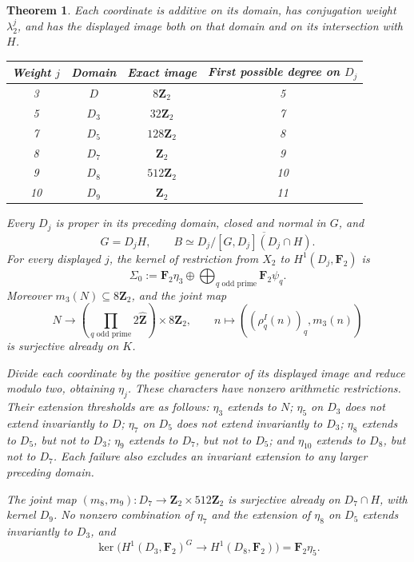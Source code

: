 \documentclass[11pt,a4paper]{article}
\newtheorem{theorem}{Theorem}[section]
\theoremstyle{definition}
\theoremstyle{remark}
\newcommand{\Zh}{\widehat{\mathbf Z}}
\newcommand{\Z}{\mathbf Z}
\newcommand{\F}{\mathbf F}
\begin{document}
\begin{theorem}\label{thm:main-finite-dyadic-examples}
Each coordinate is additive on its domain, has conjugation weight
\(\lambda_2^j\), and has the displayed image both on that domain
and on its intersection with \(H\).
\begin{center}
\begin{tabular}{@{}cccc@{}}
\toprule
Weight \(j\)&Domain&Exact image&First possible degree on \(D_j\)\\
\midrule
3&\(D\)&\(8\Z_2\)&5\\
5&\(D_3\)&\(32\Z_2\)&7\\
7&\(D_5\)&\(128\Z_2\)&8\\
8&\(D_7\)&\(\Z_2\)&9\\
9&\(D_8\)&\(512\Z_2\)&10\\
10&\(D_9\)&\(\Z_2\)&11\\
\bottomrule
\end{tabular}
\end{center}
Every \(D_j\) is proper in its preceding domain, closed and normal
in \(G\), and
\[
 G=D_jH,\qquad
 B\simeq D_j/\overline{[G,D_j](D_j\cap H)}.
\]
For every displayed \(j\), the kernel of restriction from \(X_2\)
to \(H^1(D_j,\F_2)\) is
\[
 \Sigma_0:=\F_2\eta_3\oplus
       \bigoplus_{q\text{ odd prime}}\F_2\psi_q.
\]
Moreover \(m_3(N)\subseteq8\Z_2\), and the joint map
\[
 N\longrightarrow
 \left(\prod_{q\text{ odd prime}}2\Zh\right)\times8\Z_2,
 \qquad n\longmapsto((\rho_q^I(n))_q,m_3(n))
\]
is surjective already on \(K\).

Divide each coordinate by the positive generator of its displayed
image and reduce modulo two, obtaining \(\eta_j\). These characters
have nonzero arithmetic restrictions. Their extension thresholds are
as follows: \(\eta_3\) extends to \(N\); \(\eta_5\) on \(D_3\)
does not extend invariantly to \(D\); \(\eta_7\) on \(D_5\)
does not extend invariantly to \(D_3\); \(\eta_8\) extends to
\(D_5\), but not to \(D_3\); \(\eta_9\) extends to \(D_7\),
but not to \(D_5\); and \(\eta_{10}\) extends to \(D_8\), but
not to \(D_7\). Each failure also excludes an invariant extension
to any larger preceding domain.

The joint map \((m_8,m_9):D_7\to\Z_2\times512\Z_2\)
is surjective already on \(D_7\cap H\), with kernel \(D_9\).
No nonzero combination of \(\eta_7\) and the extension of
\(\eta_8\) on \(D_5\) extends invariantly to \(D_3\), and
\[
 \ker\bigl(H^1(D_3,\F_2)^G\longrightarrow H^1(D_8,\F_2)\bigr)
 =\F_2\eta_5.
\]
\end{theorem}
\end{document}
